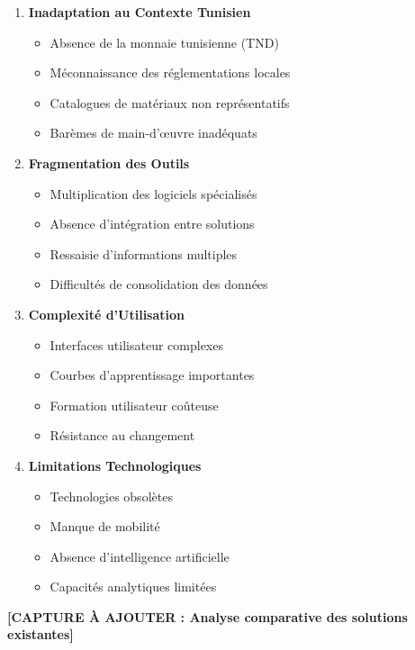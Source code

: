 \begin{enumerate}
    \item \textbf{Inadaptation au Contexte Tunisien}
    \begin{itemize}
        \item Absence de la monnaie tunisienne (TND)
        \item Méconnaissance des réglementations locales
        \item Catalogues de matériaux non représentatifs
        \item Barèmes de main-d'œuvre inadéquats
    \end{itemize}
    
    \item \textbf{Fragmentation des Outils}
    \begin{itemize}
        \item Multiplication des logiciels spécialisés
        \item Absence d'intégration entre solutions
        \item Ressaisie d'informations multiples
        \item Difficultés de consolidation des données
    \end{itemize}
    
    \item \textbf{Complexité d'Utilisation}
    \begin{itemize}
        \item Interfaces utilisateur complexes
        \item Courbes d'apprentissage importantes
        \item Formation utilisateur coûteuse
        \item Résistance au changement
    \end{itemize}
    
    \item \textbf{Limitations Technologiques}
    \begin{itemize}
        \item Technologies obsolètes
        \item Manque de mobilité
        \item Absence d'intelligence artificielle
        \item Capacités analytiques limitées
    \end{itemize}
\end{enumerate}

\textbf{[CAPTURE À AJOUTER : Analyse comparative des solutions existantes]}

